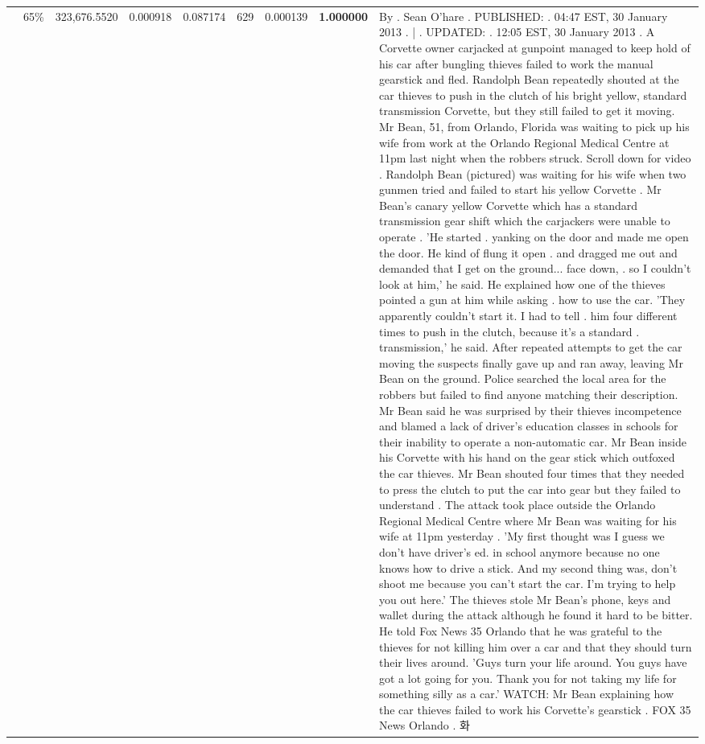 \begin{table}[H]
\begin{tabular}{llrrrrrrl}
 & 65\% & 323,676.5520 & 0.000918 & 0.087174 & \color{red} 629 & 0.000139 & \bfseries \color{red} 1.000000 & By . Sean O'hare . PUBLISHED: . 04:47 EST, 30 January 2013 . | . UPDATED: . 12:05 EST, 30 January 2013 . A Corvette owner carjacked at gunpoint managed to keep hold of his car after bungling thieves failed to work the manual gearstick and fled. Randolph Bean repeatedly shouted at the car thieves to push in the clutch of his bright yellow, standard transmission Corvette, but they still failed to get it moving. Mr Bean, 51, from Orlando, Florida was waiting to pick up his wife from work at the Orlando Regional Medical Centre at 11pm last night when the robbers struck. Scroll down for video . Randolph Bean (pictured) was waiting for his wife when two gunmen tried and failed to start his yellow Corvette . Mr Bean's canary yellow Corvette which has a standard transmission gear shift which the carjackers were unable to operate . 'He started . yanking on the door and made me open the door. He kind of flung it open . and dragged me out and demanded that I get on the ground... face down, . so I couldn't look at him,' he said. He explained how one of the thieves pointed a gun at him while asking . how to use the car. 'They apparently couldn't start it. I had to tell . him four different times to push in the clutch, because it's a standard . transmission,' he said. After repeated attempts to get the car moving the suspects finally gave up and ran away, leaving Mr Bean on the ground. Police searched the local area for the robbers but failed to find anyone matching their description. Mr Bean said he was surprised by their thieves incompetence and blamed a lack of driver's education classes in schools for their inability to operate a non-automatic car. Mr Bean inside his Corvette with his hand on the gear stick which outfoxed the car thieves. Mr Bean shouted four times that they needed to press the clutch to put the car into gear but they failed to understand . The attack took place outside the Orlando Regional Medical Centre where Mr Bean was waiting for his wife at 11pm yesterday . 'My first thought was I guess we don't have driver's ed. in school anymore because no one knows how to drive a stick. And my second thing was, don't shoot me because you can't start the car. I'm trying to help you out here.' The thieves stole Mr Bean's phone, keys and wallet during the attack although he found it hard to be bitter. He told Fox News 35 Orlando that he was grateful to the thieves for not killing him over a car and that they should turn their lives around. 'Guys turn your life around. You guys have got a lot going for you. Thank you for not taking my life for something silly as a car.' WATCH: Mr Bean explaining how the car thieves failed to work his Corvette's gearstick . FOX 35 News Orlando . 화 \\

\end{tabular}
\end{table}
